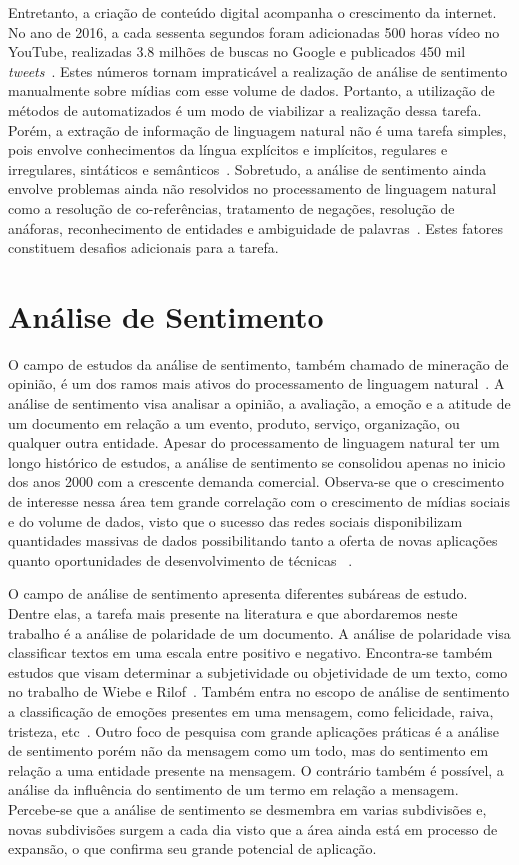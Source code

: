 Entretanto, a criação de conteúdo digital acompanha o crescimento da internet.
No ano de 2016, a cada sessenta segundos foram adicionadas 500 horas vídeo no YouTube, realizadas 3.8 milhões de buscas
no Google e publicados 450 mil \textit{tweets}~\cite{smartinsights}.
Estes números tornam impraticável a realização de análise de sentimento manualmente sobre mídias com esse volume de
dados.
Portanto, a utilização de métodos de automatizados é um modo de viabilizar a realização dessa tarefa.
Porém, a extração de informação de linguagem natural não é uma tarefa simples, pois envolve conhecimentos da língua
explícitos e implícitos, regulares e irregulares, sintáticos e semânticos~\cite{cambria13}.
Sobretudo, a análise de sentimento ainda envolve problemas ainda não resolvidos no processamento de linguagem natural
como a resolução de co-referências, tratamento de negações, resolução de anáforas, reconhecimento de entidades e
ambiguidade de palavras~\cite{cambria13}.
Estes fatores constituem desafios adicionais para a tarefa.

\section{Análise de Sentimento}

O campo de estudos da análise de sentimento, também chamado de mineração de opinião, é um dos ramos mais ativos do
processamento de linguagem natural~\cite{liu12}.
A análise de sentimento visa analisar a opinião, a avaliação, a emoção e a atitude de um documento em relação a um
evento, produto, serviço, organização, ou qualquer outra entidade.
Apesar do processamento de linguagem natural ter um longo histórico de estudos, a análise de sentimento se consolidou
apenas no inicio dos anos 2000 com a crescente demanda comercial.
Observa-se que o crescimento de interesse nessa área tem grande correlação com o crescimento de mídias sociais e do
volume de dados, visto que o sucesso das redes sociais disponibilizam quantidades massivas de dados possibilitando tanto
a oferta de novas aplicações quanto oportunidades de desenvolvimento de técnicas ~\cite{liu12}.

O campo de análise de sentimento apresenta diferentes subáreas de estudo.
Dentre elas, a tarefa mais presente na literatura e que abordaremos neste trabalho é a análise de polaridade de um
documento.
A análise de polaridade visa classificar textos em uma escala entre positivo e negativo.
Encontra-se também estudos que visam determinar a subjetividade ou objetividade de um texto, como no trabalho de Wiebe e
Rilof~\cite{Wiebe05}.
Também entra no escopo de análise de sentimento a classificação de emoções presentes em uma mensagem, como felicidade,
raiva, tristeza, etc~\cite{bollen11b}.
Outro foco de pesquisa com grande aplicações práticas é a análise de sentimento porém não da mensagem como um todo, mas
do sentimento em relação a uma entidade presente na mensagem.
O contrário também é possível, a análise da influência do sentimento de um termo em relação a mensagem.
Percebe-se que a análise de sentimento se desmembra em varias subdivisões e, novas subdivisões surgem a cada dia visto
que a área ainda está em processo de expansão, o que confirma seu grande potencial de aplicação.

